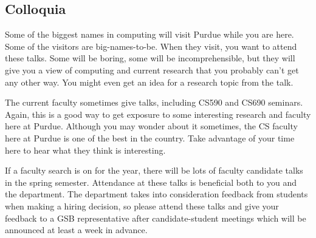 \subsection{Colloquia}

Some of the biggest names in computing will visit Purdue while you are here. Some of the visitors are big-names-to-be. When they visit, you want to attend these talks. Some will be boring, some will be incomprehensible, but they will give you a view of computing and current research that you probably can't get any other way. You might even get an idea for a research topic from the talk.

The current faculty sometimes give talks, including CS590 and CS690 seminars. Again, this is a good way to get exposure to some interesting research and faculty here at Purdue. Although you may wonder about it sometimes, the CS faculty here at Purdue is one of the best in the country. Take advantage of your time here to hear what they think is interesting.

If a faculty search is on for the year, there will be lots of faculty candidate talks in the spring semester. Attendance at these talks is beneficial both to you and the department. The department takes into consideration feedback from students when making a hiring decision, so please attend these talks and give your feedback to a GSB representative after candidate-student meetings which will be announced at least a week in advance.